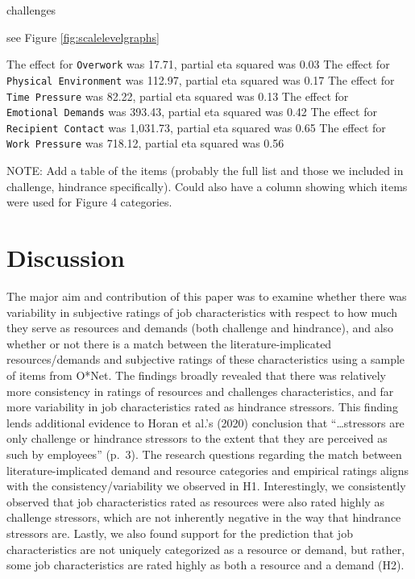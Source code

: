 \documentclass[
  english,
  man]{apa6}
\begin{document}
challenges

see Figure \ref{fig:scalelevelgraphs}

The effect for \texttt{Overwork} was 17.71, partial eta squared was 0.03
The effect for \texttt{Physical\ Environment} was 112.97, partial eta squared was 0.17
The effect for \texttt{Time\ Pressure} was 82.22, partial eta squared was 0.13
The effect for \texttt{Emotional\ Demands} was 393.43, partial eta squared was 0.42
The effect for \texttt{Recipient\ Contact} was 1,031.73, partial eta squared was 0.65
The effect for \texttt{Work\ Pressure} was 718.12, partial eta squared was 0.56

\newpage

NOTE: Add a table of the items (probably the full list and those we included in challenge, hindrance specifically). Could also have a column showing which items were used for Figure 4 categories.

\hypertarget{discussion}{%
\section{Discussion}\label{discussion}}

The major aim and contribution of this paper was to examine whether there was variability in subjective ratings of job characteristics with respect to how much they serve as resources and demands (both challenge and hindrance), and also whether or not there is a match between the literature-implicated resources/demands and subjective ratings of these characteristics using a sample of items from O*Net. The findings broadly revealed that there was relatively more consistency in ratings of resources and challenges characteristics, and far more variability in job characteristics rated as hindrance stressors. This finding lends additional evidence to Horan et al.'s (2020) conclusion that ``\ldots stressors are only challenge or hindrance stressors to the extent that they are perceived as such by employees'' (p.~3). The research questions regarding the match between literature-implicated demand and resource categories and empirical ratings aligns with the consistency/variability we observed in H1. Interestingly, we consistently observed that job characteristics rated as resources were also rated highly as challenge stressors, which are not inherently negative in the way that hindrance stressors are. Lastly, we also found support for the prediction that job characteristics are not uniquely categorized as a resource or demand, but rather, some job characteristics are rated highly as both a resource and a demand (H2).
\end{document}
